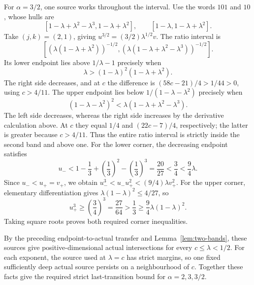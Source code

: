 For $\alpha=3/2$, one source works throughout the interval.
Use the words $101$ and $10$, whose hulls are
\[
 [1-\lambda+\lambda^2-\lambda^3,1-\lambda+\lambda^2],
 \qquad[1-\lambda,1-\lambda+\lambda^2].
\]
Take $(j,k)=(2,1)$, giving
$u^{3/2}=(3/2)\lambda^{1/2}v$.
The ratio interval is
\[
 \left[(\lambda(1-\lambda+\lambda^2))^{-1/2},
       (\lambda(1-\lambda+\lambda^2-\lambda^3))^{-1/2}\right].
\]
Its lower endpoint lies above $1/\lambda-1$ precisely when
\[
 \lambda>(1-\lambda)^2(1-\lambda+\lambda^2).
\]
The right side decreases, and at $c$ the difference is
$(58c-21)/4>1/44>0$, using $c>4/11$.
The upper endpoint lies below $1/(1-\lambda-\lambda^2)$ precisely when
\[
 (1-\lambda-\lambda^2)^2
 <\lambda(1-\lambda+\lambda^2-\lambda^3).
\]
The left side decreases, whereas the right side increases by the derivative
calculation above. At $c$ they equal $1/4$ and $(22c-7)/4$, respectively;
the latter is greater because $c>4/11$.
Thus the entire ratio interval is strictly inside the second band and
above one.
For the lower corner, the decreasing endpoint satisfies
\[
 u_-<1-\frac13+\left(\frac13\right)^2-\left(\frac13\right)^3
 =\frac{20}{27}<\frac34<\frac94\lambda.
\]
Since $u_-<u_+=v_+$, we obtain
$u_-^3<u_-u_+^2<(9/4)\lambda v_+^2$.
For the upper corner, elementary differentiation gives
$\lambda(1-\lambda)^2\le4/27$, so
\[
 u_+^3\ge\left(\frac34\right)^3=\frac{27}{64}
 >\frac13\ge\frac94\lambda(1-\lambda)^2.
\]
Taking square roots proves both required corner inequalities.

By the preceding endpoint-to-actual transfer and
Lemma~\ref{lem:two-bands}, these sources give positive-dimensional actual
intersections for every $c\le\lambda<1/2$.
For each exponent, the source used at $\lambda=c$ has strict margins,
so one fixed sufficiently deep actual source persists on a neighbourhood
of $c$. Together these facts give the required strict last-transition
bound for $\alpha=2,3,3/2$.
